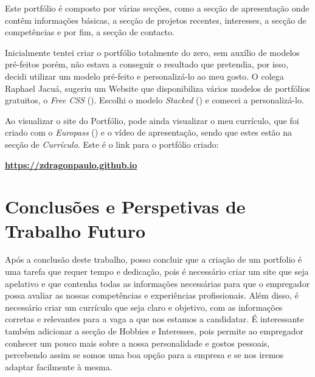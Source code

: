 \documentclass[a4paper]{article}
\begin{document}
Este portfólio é composto por várias secções, como a secção de apresentação onde contêm informações básicas, a secção de projetos recentes, 
interesses, a secção de competências e por fim, a secção de contacto.

Inicialmente tentei criar o portfólio totalmente do zero, sem auxílio de modelos pré-feitos porém, não estava a conseguir o resultado que pretendia,
por isso, decidi utilizar um modelo pré-feito e personalizá-lo ao meu gosto. O colega Raphael Jacuá, sugeriu um Website que disponibiliza vários 
modelos de portfólios gratuitos, o \textit{Free CSS} (\cite{freecss}). Escolhi o modelo \textit{Stacked} (\cite{stacked}) 
e comecei a personalizá-lo.

Ao visualizar o site do Portfólio, pode ainda visualizar o meu currículo, que foi criado com o \textit{Europass} (\cite{europass}) e o vídeo de apresentação, 
sendo que estes estão na secção de \textit{Currículo}.
Este é o link para o portfólio criado: \\
\begin{center} 
    { \large \textbf{\url{https://zdragonpaulo.github.io}}}
\end{center}


\newpage
\section{Conclusões e Perspetivas de Trabalho Futuro}\label{con}
Após a conclusão deste trabalho, posso concluir que a criação de um portfolio é uma tarefa que requer tempo e dedicação,
pois é necessário criar um site que seja apelativo e que contenha todas as informações necessárias para que o empregador possa
avaliar as nossas competências e experiências profissionais. Além disso, é necessário criar um currículo que seja claro e objetivo,
com as informações corretas e relevantes para a vaga a que nos estamos a candidatar. É interessante também adicionar a secção de 
Hobbies e Interesses, pois permite ao empregador conhecer um pouco mais sobre a nossa personalidade e gostos pessoais, percebendo 
assim se somos uma boa opção para a empresa e se nos iremos adaptar facilmente à mesma.

\newpage
{}
\printbibliography
\end{document}
